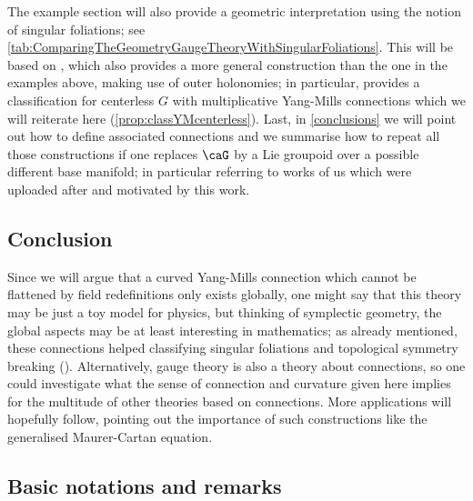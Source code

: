 \documentclass[reqno,a4paper,oneside]{amsart}
\theoremstyle{plain}
\theoremstyle{remark}
\theoremstyle{definition}
\begin{document}
The example section will also provide a geometric interpretation using the notion of singular foliations; see \ref{tab:ComparingTheGeometryGaugeTheoryWithSingularFoliations}. This will be based on \cite{Fischer:2401.05966}, which also provides a more general construction than the one in the examples above, making use of outer holonomies; in particular, \cite{Fischer:2401.05966} provides a classification for centerless $G$ with multiplicative Yang-Mills connections which we will reiterate here (\ref{prop:classYMcenterless}). Last, in \ref{conclusions} we will point out how to define associated connections and we summarise how to repeat all those constructions if one replaces $\caG$ by a Lie groupoid over a possible different base manifold; in particular referring to works of us which were uploaded after and motivated by this work.

\subsection{Conclusion}

Since we will argue that a curved Yang-Mills connection which cannot be flattened by field redefinitions only exists globally, one might say that this theory may be just a toy model for physics, but thinking of symplectic geometry, the global aspects may be at least interesting in mathematics; as already mentioned, these connections helped classifying singular foliations and topological symmetry breaking (\cite{Fischer:2401.05966, Fischer:2024hqy}). Alternatively, gauge theory is also a theory about connections, so one could investigate what the sense of connection and curvature given here implies for the multitude of other theories based on connections. More applications will hopefully follow, pointing out the importance of such constructions like the generalised Maurer-Cartan equation.

\subsection{Basic notations and remarks}\label{BasicNotations}
\end{document}
